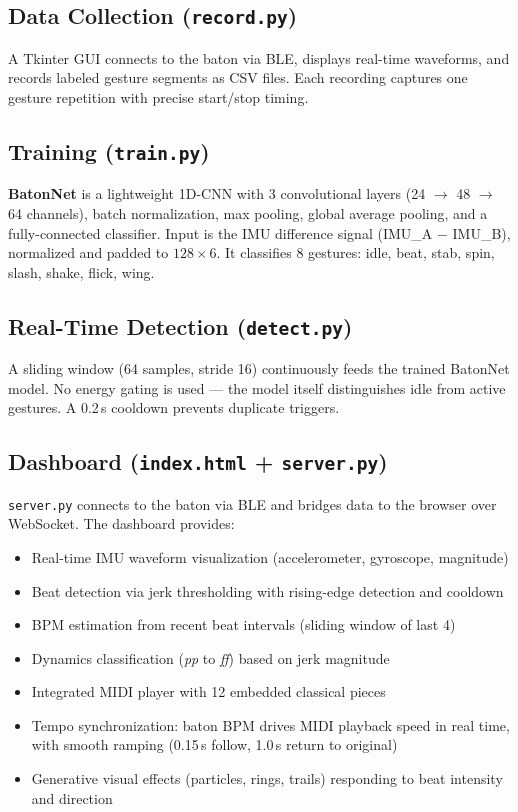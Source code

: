 \documentclass[11pt]{article}
\begin{document}
\subsection{Data Collection (\texttt{record.py})}
A Tkinter GUI connects to the baton via BLE, displays real-time waveforms, and records labeled gesture segments as CSV files. Each recording captures one gesture repetition with precise start/stop timing.

\subsection{Training (\texttt{train.py})}
\textbf{BatonNet} is a lightweight 1D-CNN with 3 convolutional layers (24 $\to$ 48 $\to$ 64 channels), batch normalization, max pooling, global average pooling, and a fully-connected classifier. Input is the IMU difference signal (IMU\_A $-$ IMU\_B), normalized and padded to $128 \times 6$. It classifies 8 gestures: idle, beat, stab, spin, slash, shake, flick, wing.

\subsection{Real-Time Detection (\texttt{detect.py})}
A sliding window (64 samples, stride 16) continuously feeds the trained BatonNet model. No energy gating is used --- the model itself distinguishes idle from active gestures. A 0.2\,s cooldown prevents duplicate triggers.

\subsection{Dashboard (\texttt{index.html} + \texttt{server.py})}
\texttt{server.py} connects to the baton via BLE and bridges data to the browser over WebSocket. The dashboard provides:
\begin{itemize}[nosep]
  \item Real-time IMU waveform visualization (accelerometer, gyroscope, magnitude)
  \item Beat detection via jerk thresholding with rising-edge detection and cooldown
  \item BPM estimation from recent beat intervals (sliding window of last 4)
  \item Dynamics classification (\textit{pp} to \textit{ff}) based on jerk magnitude
  \item Integrated MIDI player with 12 embedded classical pieces
  \item Tempo synchronization: baton BPM drives MIDI playback speed in real time, with smooth ramping (0.15\,s follow, 1.0\,s return to original)
  \item Generative visual effects (particles, rings, trails) responding to beat intensity and direction
\end{itemize}
\end{document}
